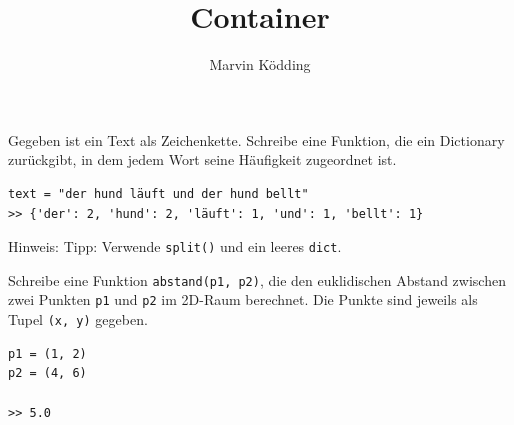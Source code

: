 \documentclass[a4paper, 12pt]{mksheetphhd}
\title{Container}
\author{Marvin Ködding}
\begin{document}
	\printtitle
	
	\vspace*{.5cm}
	
	\begin{aufgabe}
		Gegeben ist ein Text als Zeichenkette. Schreibe eine Funktion, die ein Dictionary zurückgibt, in dem jedem Wort seine Häufigkeit zugeordnet ist.
		
		\begin{verbatim}
text = "der hund läuft und der hund bellt"
>> {'der': 2, 'hund': 2, 'läuft': 1, 'und': 1, 'bellt': 1}
		\end{verbatim}
		Hinweis: Tipp: Verwende \verb|split()| und ein leeres \verb|dict|.
	\end{aufgabe}
	
	\begin{aufgabe}
		Schreibe eine Funktion \verb|abstand(p1, p2)|, die den euklidischen Abstand zwischen zwei Punkten \verb|p1| und \verb|p2| im 2D-Raum berechnet. Die Punkte sind jeweils als Tupel \verb|(x, y)| gegeben.
		\begin{verbatim}
p1 = (1, 2)
p2 = (4, 6)

>> 5.0
		\end{verbatim}
		
	\end{aufgabe}
	
	\printlicense
	
	\printsocials
	
\end{document}
